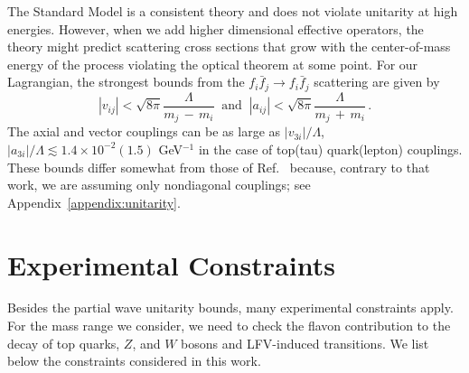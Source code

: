 \documentclass[prd,amsfonts,onecolumn,superscriptaddress,aps,nofootinbib,11pt]{revtex4-1}
\begin{document}
The Standard Model is a consistent theory and does not violate unitarity at high energies. However, when we add higher dimensional effective operators, the theory might predict scattering cross sections that grow with the center-of-mass energy of the process violating the optical theorem at some point. For our Lagrangian, the strongest bounds from the $f_i \bar{f}_j \rightarrow f_i \bar{f}_j$ scattering are given by
%
\begin{equation}\label{eq:unitarity-bounds}
  \left|v_{ij} \right| < \sqrt{8\pi}\frac{\Lambda}{m_j\,-\,m_i} \;\;\mbox{and}\;\; \left|a_{ij} \right| < \sqrt{8\pi}\frac{\Lambda}{m_j\,+\,m_i}\, .
\end{equation}
The axial and vector couplings can be as large as $\left|v_{3i}\right|/\Lambda$, $\left|a_{3i}\right|/\Lambda \lesssim 1.4\times 10^{-2}(1.5)$ GeV$^{-1}$ in the case of top(tau) quark(lepton) couplings. These bounds differ somewhat from those of Ref.~\cite{Cornella:2019uxs} because, contrary to that work, we are assuming only nondiagonal couplings; see Appendix~\ref{appendix:unitarity}.

\section{Experimental Constraints}
\label{exp-const}
 
 Besides the partial wave unitarity bounds, many experimental constraints apply. For the mass range we consider, we need to check the flavon contribution to the decay of top quarks, $Z$, and $W$ bosons and LFV-induced transitions. We list below the constraints considered in this work.
\end{document}
